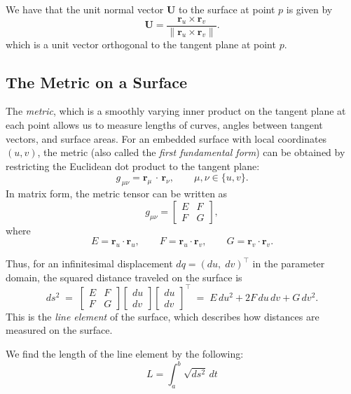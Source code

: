 \documentclass[12pt]{article}
\begin{document}
We have that the unit normal vector $\mathbf{U}$ to the surface at point $p$ is given by
\[
\mathbf{U} = \frac{\mathbf{r}_u\times\mathbf{r}_v}{\|\mathbf{r}_u\times\mathbf{r}_v\|}.
\]
which is a unit vector orthogonal to the tangent plane at point $p$.

\subsection{The Metric on a Surface}
The \emph{metric}, which is a smoothly varying inner product on the tangent plane at each point allows us to measure lengths of curves, angles between tangent vectors, and surface areas. 
For an embedded surface with local coordinates $(u,v)$, the metric (also called the \emph{first fundamental form}) can be obtained by restricting the Euclidean dot product to the tangent plane:
\[
g_{\,\mu\nu} = \mathbf{r}_\mu\,\cdot\,\mathbf{r}_\nu, \qquad \mu,\nu \in \{u,v\}.
\]
In matrix form, the metric tensor can be written as 
\[
g_{\mu\nu} = 
\begin{bmatrix}
E & F\\[1ex]
F & G
\end{bmatrix},
\] 
where 
\begin{equation}\label{eq:metric-coefficients}
	E = \mathbf{r}_u\cdot \mathbf{r}_u, \qquad F = \mathbf{r}_u\cdot \mathbf{r}_v, \qquad G = \mathbf{r}_v\cdot \mathbf{r}_v.
\end{equation}

Thus, for an infinitesimal displacement $dq = (du,\;dv)^\top$ in the parameter domain, the squared distance traveled on the surface is 
\begin{equation}\label{eq:line-element}
ds^{2} \;=\; \begin{bmatrix}
	E & F\\[1ex]
	F & G
\end{bmatrix} \begin{bmatrix}
	du\\[1ex]
	dv
\end{bmatrix} \begin{bmatrix}
	du\\[1ex]
	dv
\end{bmatrix}^{\top} \;=\; E\,du^{2} + 2F\,du\,dv + G\,dv^{2}.
\end{equation}
This is the \emph{line element} of the surface, which describes how distances are measured on the surface.

We find the length of the line element by the following:
\[
	L = \int_{a}^{b} \sqrt{ds^{2}} \, dt
\]
\end{document}
